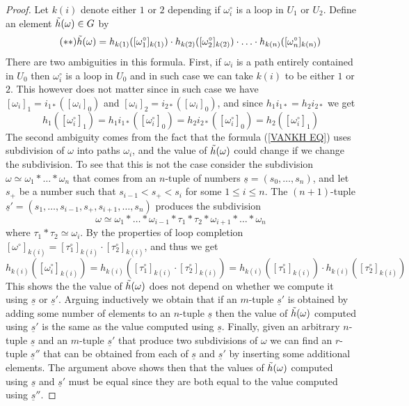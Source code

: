 \documentclass[11pt, letterpaper, oneside]{report}
\theoremstyle{pplain}
\theoremstyle{ddefinition}
\theoremstyle{nnn}
\theoremstyle{eexercise}
\newcommand{\ntilde}{\skew{3}\tilde}
\begin{document}
\begin{proof}
Let $k(i)$ denote either $1$ or $2$ depending if $\omega_{i}^{\circ}$
is a loop in $U_{1}$ or $U_{2}$. Define an element $\ntilde h(\omega)\in G$ by 
\begin{equation*}
\label{VANKH EQ}
\tag{$\ast\ast$}
\ntilde h(\omega) = h_{k(1)}([\omega_{1}^{\circ}]_{k(1)}) \cdot h_{k(2)}([\omega_{2}^{\circ}]_{k(2)})\cdot {\dots}
\cdot  h_{k(n)}([\omega_{n}^{\circ}]_{k(n)})
\end{equation*}
There are two ambiguities in this formula.  First, if $\omega_{i}$ is a path entirely contained 
in $U_{0}$ then $\omega_{i}^{\circ}$ is a loop in $U_{0}$ and in such case we can take $k(i)$
to be either $1$ or $2$. This however does not matter since in such case we have 
$[\omega_{i}]_{1} = i_{1\ast}([\omega_{i}]_{0})$ and $[\omega_{i}]_{2} = i_{2\ast}([\omega_{i}]_{0})$,
and  since $h_{1}i_{1\ast} = h_{2}i_{2\ast}$ we get 
$$h_{1}([\omega_{i}^{\circ}]_{1}) = h_{1}i_{1\ast}([\omega_{i}^{\circ}]_{0}) 
= h_{2}i_{2\ast}([\omega_{i}^{\circ}]_{0}) = h_{2}([\omega_{i}^{\circ}]_{1})$$
The second ambiguity comes from the fact that the formula (\ref{VANKH EQ})  uses 
subdivision of $\omega$ into paths $\omega_{i}$, and the value of $\ntilde{h}(\omega)$ could change 
if we change the subdivision. To see that this is not the case consider the subdivision  
$\omega\simeq \omega_{1}\ast {\dots} \ast \omega_{n}$
that comes from an $n$-tuple of numbers $\underline{s} = (s_{0}, \dots, s_{n})$, and let $s_{+}$ 
be a number such that $s_{i-1} < s_{+} < s_{i}$ for some $1\leq i \leq n$. The $(n+1)$-tuple 
$\underline{s}' = (s_{1}, \dots, s_{i-1}, s_{+}, s_{i+1}, \dots, s_{n})$ produces the subdivision 
$$\omega \simeq \omega_{1}\ast {\dots} \ast \omega_{i-1} \ast \tau_{1}\ast \tau_{2} 
\ast \omega_{i+1} \ast {\dots}\ast \omega_{n}$$
where $\tau_{1}\ast \tau_{2} \simeq \omega_{i}$.  By the properties of loop completion
$[\omega^{\circ}]_{k(i)} = [\tau_{1}^{\circ}]_{k(i)} \cdot [\tau_{2}^{\circ}]_{k(i)}$, and thus we get 
$$h_{k(i)}([\omega_{i}^{\circ}]_{k(i)}) = h_{k(i)}([\tau_{1}^{\circ}]_{k(i)} \cdot [\tau_{2}^{\circ}]_{k(i)})
= h_{k(i)}([\tau_{1}^{\circ}]_{k(i)})\cdot h_{k(i)}([\tau_{2}^{\circ}]_{k(i)})$$
This shows the the value of $\ntilde{h}(\omega)$ does not depend on whether we compute it using  
$\underline{s}$ or $\underline{s}'$. 
Arguing inductively we obtain that if an $m$-tuple $\underline{s}'$ is obtained by 
adding some number of elements to an $n$-tuple $\underline{s}$ then the value of 
$\ntilde{h}(\omega)$ computed using $\underline{s}'$ is the same as the value 
computed using $\underline{s}$. Finally,  given an  arbitrary $n$-tuple 
$\underline{s}$ and an $m$-tuple $\underline{s}'$ that produce two subdivisions 
of $\omega$  we can find an $r$-tuple $\underline{s}''$ that can be obtained from each of  
$\underline{s}$  and $\underline{s}'$ by inserting some additional elements. The argument 
above shows then that the values of $\ntilde{h}(\omega)$ computed using $\underline{s}$
and $\underline{s}'$ must be equal since they are both equal to the value computed using 
$\underline{s}''$.


\end{proof}
\end{document}
